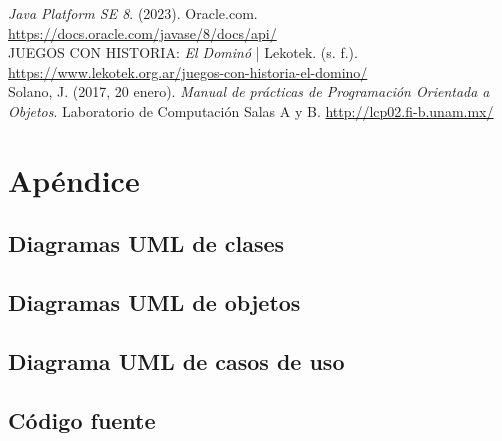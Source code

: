 \documentclass[12pt]{article}
\begin{document}
  \textit{Java Platform SE 8}. (2023). Oracle.com. \url{https://docs.oracle.com/javase/8/docs/api/} \\

  JUEGOS CON HISTORIA: \textit{El Dominó} | Lekotek. (s. f.). \url{https://www.lekotek.org.ar/juegos-con-historia-el-domino/} \\

  Solano, J. (2017, 20 enero). \textit{Manual de prácticas de Programación Orientada a Objetos}. Laboratorio de Computación Salas A y B. \url{http://lcp02.fi-b.unam.mx/} 

  \section{Apéndice}
  \subsection{Diagramas UML de clases}


  \subsection{Diagramas UML de objetos}


  \subsection{Diagrama UML de casos de uso}


  \subsection{Código fuente}
\end{document}
